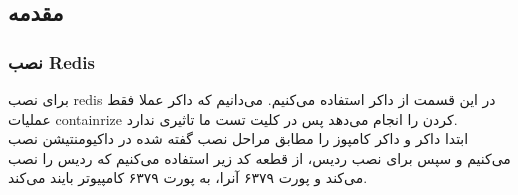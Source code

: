 \subsection{مقدمه}
\subsubsection{نصب Redis}
برای نصب 
redis 
در این قسمت از داکر
استفاده می‌کنیم.
می‌دانیم که داکر 
عملا فقط عملیات 
containrize 
کردن را انجام
می‌دهد
پس  در کلیت تست ما 
تاثیری ندارد.
\\
ابتدا داکر و داکر کامپوز را مطابق مراحل نصب گفته شده در
داکیومنتیشن نصب می‌کنیم و سپس 
برای نصب ردیس، از قطعه کد زیر استفاده می‌کنیم که 
ردیس را نصب می‌کند و پورت ۶۳۷۹ آنرا، به پورت ۶۳۷۹ کامپیوتر بایند می‌کند.
